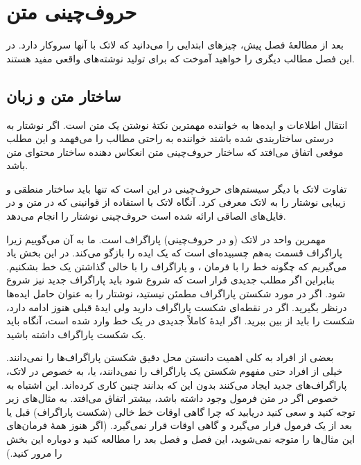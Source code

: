 \chapter{حروف‌چینی متن}
\begin{intro}
بعد از مطالعهٔ فصل پیش، چیزهای ابتدایی را می‌دانید که لاتک با آنها سروکار دارد. در این فصل مطالب دیگری را خواهید آموخت که برای تولید نوشته‌های واقعی مفید هستند.
\end{intro}
\section{ساختار متن و زبان}
 انتقال اطلاعات و ایده‌ها به خواننده مهمترین نکتهٔ نوشتن یک متن است. اگر نوشتار به درستی ساختاربندی شده باشند خواننده به راحتی مطالب را می‌فهمد و این مطلب موقعی اتفاق می‌افتد که ساختار حروف‌چینی متن انعکاس دهنده ساختار محتوای متن باشد.

تفاوت لاتک با دیگر سیستم‌های حروف‌چینی در این است که تنها باید ساختار منطقی و زیبایی نوشتار را به لاتک معرفی کرد. آنگاه لاتک  با استفاده از قوانینی که در متن و در فایل‌های الصاقی ارائه شده است حروف‌چینی نوشتار را انجام می‌دهد. 

مهمرین واحد در لاتک (و در حروف‌چینی) پاراگراف 
 است. ما به آن 
می‌گوییم زیرا پاراگراف قسمت به‌هم‌ چسبیده‌ای است که یک ایده را بازگو می‌کند. در این بخش یاد می‌گیریم که چگونه خط را با فرمان \texttt{\bs\bs}، 
و پاراگراف‌ را با خالی گذاشتن یک خط بشکنیم. بنابراین اگر مطلب جدیدی قرار است که شروع شود باید پاراگراف جدید نیز شروع شود. 
اگر در مورد شکستن پاراگراف مطمئن نیستید، نوشتار را به عنوان حامل ایده‌ها درنظر بگیرید. اگر در نقطه‌ای شکست پاراگراف دارید ولی ایدۀ قبلی هنوز ادامه دارد، شکست را باید از بین ببرید. اگر ایدۀ کاملاً جدیدی در یک خط وارد شده است، آنگاه باید یک شکست پاراگراف داشته باشید.

بعضی از افراد به کلی اهمیت دانستن محل دقیق شکستن پاراگراف‌ها را نمی‌دانند. خیلی از افراد حتی مفهوم شکستن یک پاراگراف را نمی‌دانند، یا، به خصوص در لاتک، پاراگراف‌های جدید ایجاد می‌کنند بدون این که بدانند چنین کاری کرده‌اند. این اشتباه به خصوص اگر در متن فرمول وجود داشته باشد، بیشتر اتفاق می‌افتد. 
به مثال‌های زیر توجه کنید و سعی کنید دریابید که چرا گاهی اوقات خط خالی (شکست پاراگراف)
قبل یا بعد از یک فرمول قرار می‌گیرد و گاهی اوقات قرار نمی‌گیرد.
(اگر هنوز همهٔ فرمان‌های این مثال‌ها را متوجه نمی‌شوید، این فصل و فصل بعد را مطالعه کنید و دوباره این بخش را مرور کنید.)

